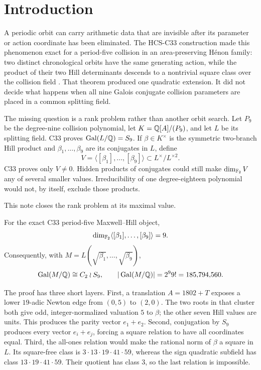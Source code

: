 \section{Introduction}

A periodic orbit can carry arithmetic data that are invisible after its
parameter or action coordinate has been eliminated.  The HCS-C33
construction made this phenomenon exact for a period-five collision in an
area-preserving H\'enon family: two distinct chronological orbits have the
same generating action, while the product of their two Hill determinants
descends to a nontrivial square class over the collision field
\citep{hcs2026c33note,hcs2026c33certificate}.  That theorem produced one
quadratic extension.  It did not decide what happens when all nine Galois
conjugate collision parameters are placed in a common splitting field.

The missing question is a rank problem rather than another orbit search.
Let \(P_9\) be the degree-nine collision polynomial, let
\(K=\mathbb{Q}[A]/(P_9)\), and let \(L\) be its splitting field.  C33 proves
\(\operatorname{Gal}(L/\mathbb{Q})=S_9\).  If \(\beta\in K^\times\) is the symmetric
two-branch Hill product and \(\beta_1,\ldots,\beta_9\) are its conjugates
in \(L\), define
\[
 V=\langle[\beta_1],\ldots,[\beta_9]\rangle
 \subset L^\times/L^{\times2}.
\]
C33 proves only \(V\ne0\).  Hidden products of conjugates could still make
\(\dim_{\mathbb{F}_2}V\) any of several smaller values.  Irreducibility of one
degree-eighteen polynomial would not, by itself, exclude those products.

This note closes the rank problem at its maximal value.

\begin{theorem}\label{thm:intro-main}
For the exact C33 period-five Maxwell--Hill object,
\[
 \dim_{\mathbb{F}_2}\langle[\beta_1],\ldots,[\beta_9]\rangle=9.
\]
Consequently, with
\(M=L(\sqrt{\beta_1},\ldots,\sqrt{\beta_9})\),
\[
 \operatorname{Gal}(M/\mathbb{Q})\cong C_2\mathbin{\wr} S_9,
 \qquad |\operatorname{Gal}(M/\mathbb{Q})|=2^9 9!=185{,}794{,}560.
\]
\end{theorem}

The proof has three short layers.  First, a translation
\(A=1802+T\) exposes a lower \(19\)-adic Newton edge from \((0,5)\) to
\((2,0)\).  The two roots in that cluster both give odd, integer-normalized
valuation \(5\) to \(\beta\); the other seven Hill values are units.  This
produces the parity vector \(e_1+e_2\).  Second, conjugation by \(S_9\)
produces every vector \(e_i+e_j\), forcing a square relation to have all
coordinates equal.  Third, the all-ones relation would make the rational
norm of \(\beta\) a square in \(L\).  Its square-free class is
\(3\cdot13\cdot19\cdot41\cdot59\), whereas the sign quadratic subfield has
class \(13\cdot19\cdot41\cdot59\).  Their quotient has class \(3\), so the
last relation is impossible.

